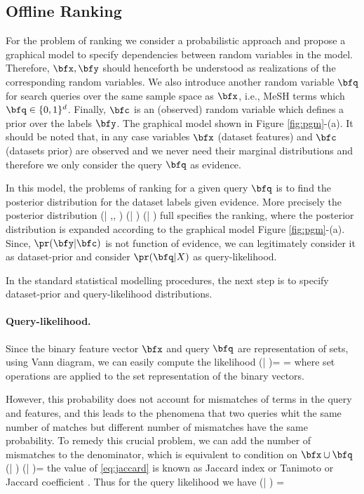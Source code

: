 \documentclass[twoside,11pt]{article}
\begin{document}
\subsection{Offline Ranking}
For the problem of ranking we consider a probabilistic approach and propose a graphical model to specify dependencies between random variables in the model. Therefore, $\bfx, \bfy$ should henceforth be understood as realizations of the corresponding random variables.
We also introduce another random variable $\bfq$ for search queries over the same sample space as $\bfx$, i.e., MeSH terms which $\bfq \in\{0,1\}^{d}$.  Finally, $\bfc$ is an (observed) random variable which defines a prior over the labels $\bfy$.
The graphical model shown in Figure \ref{fig:pgm}-(a). It should be noted that, in any case variables $\bfx$ (dataset features) and $\bfc$ (datasets prior) are observed and we never need their marginal distributions and therefore we only consider the query $\bfq$ as evidence.

In this model, the problems of ranking for a given query $\bfq$ is to find the posterior distribution for the dataset labels given evidence. More precisely the posterior distribution
\beq
\pr(\bfy | \bfq,\bfc, \bfx) \propto \pr(\bfy | \bfc ) \pr(\bfq | \bfx)
\eeq
full specifies the ranking, where the posterior distribution is expanded according to the graphical model Figure \ref{fig:pgm}-(a). 
Since, $\pr(\bfy | \bfc )$  is not function of evidence, we can legitimately consider it as dataset-prior and consider $\pr(\bfq | X)$ as query-likelihood.

In the standard statistical modelling procedures, the next step is to specify dataset-prior and query-likelihood distributions.

\paragraph{Query-likelihood.} Since the binary feature vector $\bfx$ and query $\bfq$ are representation of sets, using Vann diagram, we can easily compute the likelihood
\beq
\pr(\bfq | \bfx)= \frac{\pr(\bfq , \bfx)}{\pr(\bfx)} = \frac{|\bfq \cap \bfx|}{|\bfx|}
\eeq
where set operations are applied to the set representation of the binary vectors.

However, this probability does not account for mismatches of terms in the query and features, and this leads to the phenomena that two queries whit the same number of matches but different number of mismatches have the same probability. To remedy this crucial problem, we can add the number of mismatches to the denominator, which is equivalent to condition on $\bfx \cup \bfq$
\beq \label{eq:jaccard}
\widehat{\pr}(\bfq | \bfx ) \propto \pr(\bfq | \bfx \cup \bfq)= \frac{|\bfq \cap \bfx|}{|\bfq \cup \bfx|}
\eeq
the value of \eqref{eq:jaccard} is known as Jaccard index or Tanimoto or Jaccard coefficient \cite{book:IR}. Thus for the query likelihood we have
\beq \label{eq:jaccard}
\widehat{\pr}(\bfq | \bfx ) = 
\eeq
\end{document}

